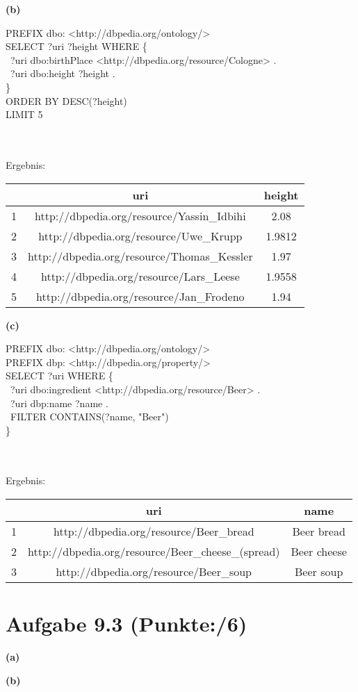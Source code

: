 \documentclass[11pt, a4paper]{article}
\newcommand{\blattnummer}{9}
\newcommand{\ppp}{6}
\newcommand{\aufgabe}[2] {\section*{Aufgabe \blattnummer.#1 (Punkte:\qquad/#2)}}
\newcommand{\aufgabenteil}[1] {\textbf{(#1)}}
\begin{document}
\aufgabenteil{b}
\begin{adjustwidth}{20pt}{20pt}
\begin{tt}
PREFIX dbo:  <http://dbpedia.org/ontology/>\\
SELECT ?uri ?height WHERE \{\\
\null\qquad\ ?uri dbo:birthPlace <http://dbpedia.org/resource/Cologne> .\\
\null\qquad\ ?uri dbo:height ?height .\\
\}\\
ORDER BY DESC(?height)\\
LIMIT 5
\end{tt}
\\ \ \\
Ergebnis:\\
\begin{tabular}{ |c|c|c| } 
 \hline
 & uri & height \\ 
 \hline
1 & http://dbpedia.org/resource/Yassin\_Idbihi & 2.08\\ 
2 & http://dbpedia.org/resource/Uwe\_Krupp & 1.9812\\ 
3 & http://dbpedia.org/resource/Thomas\_Kessler & 1.97\\ 
4 & http://dbpedia.org/resource/Lars\_Leese & 1.9558\\ 
5 & http://dbpedia.org/resource/Jan\_Frodeno & 1.94\\ 
 \hline
\end{tabular}
\end{adjustwidth}
\aufgabenteil{c}
\begin{adjustwidth}{20pt}{20pt}
\begin{tt}
PREFIX dbo:  <http://dbpedia.org/ontology/>\\
PREFIX dbp: <http://dbpedia.org/property/>\\
SELECT ?uri WHERE \{\\
\null\qquad\ ?uri dbo:ingredient <http://dbpedia.org/resource/Beer> .\\
\null\qquad\ ?uri dbp:name ?name .\\
\null\qquad\ FILTER CONTAINS(?name, "Beer")\\
\}
\end{tt}
\\ \ \\
Ergebnis:\\
\begin{tabular}{ |c|c|c| } 
 \hline
 & uri & name \\ 
 \hline
1 & http://dbpedia.org/resource/Beer\_bread & Beer bread\\ 
2 & http://dbpedia.org/resource/Beer\_cheese\_(spread) & Beer cheese\\ 
3 & http://dbpedia.org/resource/Beer\_soup & Beer soup\\
 \hline
\end{tabular}
\end{adjustwidth}



\aufgabe{3}{\ppp}
\aufgabenteil{a}
\begin{adjustwidth}{20pt}{20pt}

\end{adjustwidth}
\aufgabenteil{b}
\begin{adjustwidth}{20pt}{20pt}

\end{adjustwidth}

\end{document}
